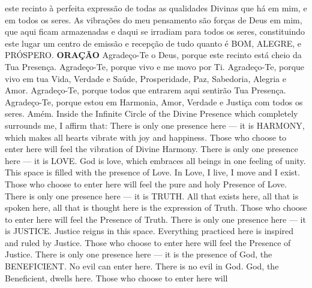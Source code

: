 {\begin{songs}{}
        este recinto à perfeita expressão de todas as
        qualidades Divinas que há em mim, e em todos os
        seres.
        \parspace
        As vibrações do meu pensamento são forças de Deus
        em mim, que aqui ficam armazenadas e daqui se
        irradiam para todos os seres, constituindo este
        lugar um centro de emissão e recepção de tudo
        quanto é BOM, ALEGRE, e PRÓSPERO.
        \parspace
        \textbf{ORAÇÃO}
        \parspace
        Agradeço-Te o Deus, porque este recinto está cheio
        da Tua Presença.
        \parspace
        Agradeço-Te, porque vivo e me movo por Ti.
        \parspace
        Agradeço-Te, porque vivo em tua Vida, Verdade e
        Saúde, Prosperidade, Paz, Sabedoria, Alegria e Amor.
        \parspace
        Agradeço-Te, porque todos que entrarem aqui sentirão
        Tua Presença.
        \parspace
        Agradeço-Te, porque estou em Harmonia, Amor, Verdade
        e Justiça com todos os seres.
        \parspace
        Amém.
      \endverse
      \beginverse
        \parspace
        Inside the Infinite Circle of the Divine Presence
        which completely surrounds me, I affirm that:
        \parspace
        There is only one presence here --- it is HARMONY,
        which makes all hearts vibrate with joy and happiness.
        Those who choose to enter here will feel the vibration
        of Divine Harmony.
        \parspace
        There is only one presence here --- it is LOVE.
        God is love, which embraces all beings in one
        feeling of unity. This space is filled with the
        presence of Love. In Love, I live, I move and I
        exist. Those who choose to enter here will feel
        the pure and holy Presence of Love.
        \parspace
        There is only one presence here --- it is TRUTH.
        All that exists here, all that is spoken here,
        all that is thought here is the expression of
        Truth. Those who choose to enter here will feel
        the Presence of Truth.
        \parspace
        There is only one presence here --- it is JUSTICE.
        Justice reigns in this space. Everything practiced
        here is inspired and ruled by Justice. Those who
        choose to enter here will feel the Presence of
        Justice.
        \parspace
        There is only one presence here --- it is the
        presence of God, the BENEFICIENT. No evil can enter
        here. There is no evil in God. God, the Beneficient,
        dwells here. Those who choose to enter here will

\end{songs}}
